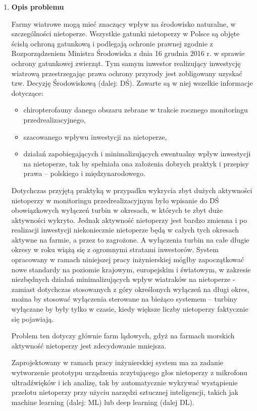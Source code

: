 \documentclass{sprz}
\begin{document}
\begin{enumerate}[label=\textbf{\arabic*}.]
  \item \textbf{Opis problemu}
  
    Farmy wiatrowe mogą mieć znaczący wpływ na środowisko naturalne, w szczególności nietoperze. Wszystkie gatunki nietoperzy w Polsce są objęte ścisłą ochroną gatunkową i podlegają ochronie prawnej zgodnie z Rozporządzeniem Ministra Środowiska z dnia 16 grudnia 2016 r. w sprawie ochrony gatunkowej zwierząt. Tym samym inwestor realizujący inwestycję wiatrową przestrzegając prawa ochrony przyrody jest zobligowany uzyskać tzw. Decyzję Środowiskową (dalej: DŚ). Zawarte są w niej wszelkie informacje dotyczące:
    \begin{itemize}
      \item chiropterofauny danego obszaru zebrane w trakcie rocznego monitoringu przedrealizacyjnego,
      \item szacowanego wpływu inwestycji na nietoperze,
      \item działań zapobiegających i minimalizujących ewentualny wpływ inwestycji na nietoperze, tak by spełniała ona założenia dobrych praktyk i przepisy prawa – polskiego i międzynarodowego.
    \end{itemize}

    Dotychczas przyjętą praktyką w przypadku wykrycia zbyt dużych aktywności nietoperzy w monitoringu przedrealizacyjnym było wpisanie do DŚ obowiązkowych wyłączeń turbin w okresach, w których te zbyt duże aktywności wykryto. Jednak aktywność nietoperzy jest bardzo zmienna i po realizacji inwestycji niekoniecznie nietoperze będą w całych tych okresach aktywne na farmie, a przez to zagrożone. A wyłączenia turbin na całe długie okresy w roku wiążą się z ogromnymi stratami inwestorów. System opracowany w ramach niniejszej pracy inżynierskiej mógłby zapoczątkować nowe standardy na poziomie krajowym, europejskim i światowym, w zakresie niezbędnych działań minimalizujących wpływ wiatraków na nietoperze - zamiast dotychczas stosowanych z góry określonych wyłączeń na długi okres, można by stosować wyłączenia sterowane na bieżąco systemem – turbiny wyłączane by były tylko w czasie, kiedy większe liczby nietoperzy faktycznie się pojawiają.

    Problem ten dotyczy głównie farm lądowych, gdyż na farmach morskich aktywność nietoperzy jest zdecydowanie mniejsza.

    Zaprojektowany w ramach pracy inżynierskiej system ma za zadanie wytworzenie prototypu urządzenia zczytującego głos nietoperzy z mikrofonu ultradźwięków i ich analizę, tak by automatycznie wykrywać wystąpienie przelotu nietoperzy przy użyciu narzędzi sztucznej inteligencji, takich jak machine learning (dalej: ML) lub deep learning (dalej DL).


\end{enumerate}
\end{document}
